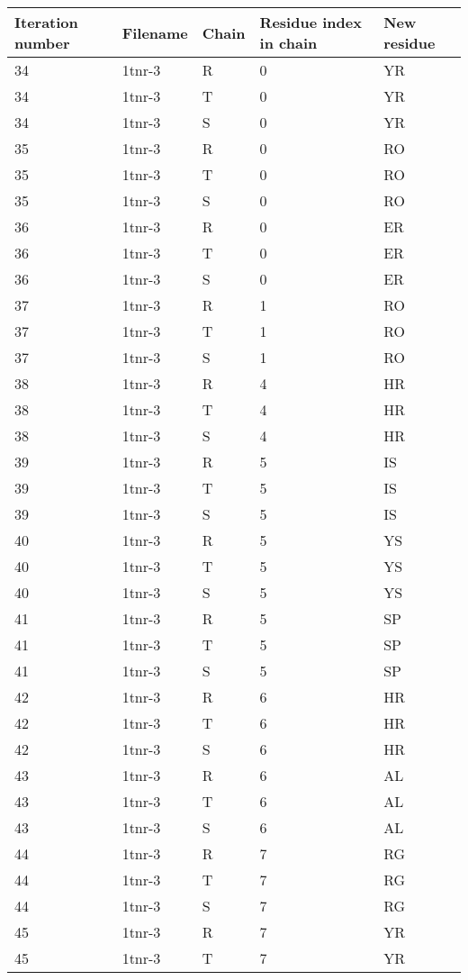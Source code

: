 \begin{tiny}
\begin{longtable}[l]{l|l|l|l|l}
	Iteration number & Filename & Chain & Residue index in chain & New residue\\ \hline
	34 & 1tnr-3 & R & 0 & YR \\
	34 & 1tnr-3 & T & 0 & YR \\
	34 & 1tnr-3 & S & 0 & YR \\
	35 & 1tnr-3 & R & 0 & RO \\
	35 & 1tnr-3 & T & 0 & RO \\
	35 & 1tnr-3 & S & 0 & RO \\
	36 & 1tnr-3 & R & 0 & ER \\
	36 & 1tnr-3 & T & 0 & ER \\
	36 & 1tnr-3 & S & 0 & ER \\
	37 & 1tnr-3 & R & 1 & RO \\
	37 & 1tnr-3 & T & 1 & RO \\
	37 & 1tnr-3 & S & 1 & RO \\
	38 & 1tnr-3 & R & 4 & HR \\
	38 & 1tnr-3 & T & 4 & HR \\
	38 & 1tnr-3 & S & 4 & HR \\
	39 & 1tnr-3 & R & 5 & IS \\
	39 & 1tnr-3 & T & 5 & IS \\
	39 & 1tnr-3 & S & 5 & IS \\
	40 & 1tnr-3 & R & 5 & YS \\
	40 & 1tnr-3 & T & 5 & YS \\
	40 & 1tnr-3 & S & 5 & YS \\
	41 & 1tnr-3 & R & 5 & SP \\
	41 & 1tnr-3 & T & 5 & SP \\
	41 & 1tnr-3 & S & 5 & SP \\
	42 & 1tnr-3 & R & 6 & HR \\
	42 & 1tnr-3 & T & 6 & HR \\
	42 & 1tnr-3 & S & 6 & HR \\
	43 & 1tnr-3 & R & 6 & AL \\
	43 & 1tnr-3 & T & 6 & AL \\
	43 & 1tnr-3 & S & 6 & AL \\
	44 & 1tnr-3 & R & 7 & RG \\
	44 & 1tnr-3 & T & 7 & RG \\
	44 & 1tnr-3 & S & 7 & RG \\
	45 & 1tnr-3 & R & 7 & YR \\
	45 & 1tnr-3 & T & 7 & YR \\

\end{longtable}
\end{tiny}
